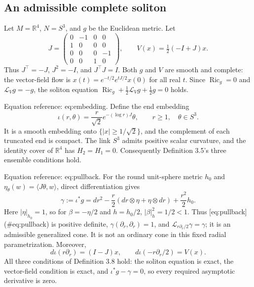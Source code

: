 \documentclass[10pt]{article}
\begin{document}
\subsection*{An admissible complete soliton}
Let \(M=\mathbb R^4\), \(N=S^3\), and \(g\) be the Euclidean metric. Let \[J=\begin{pmatrix}0&-1&0&0\\1&0&0&0\\0&0&0&-1\\0&0&1&0\end{pmatrix},
 \qquad V(x)=\tfrac12(-I+J)x .\] Thus \(J^\top=-J\), \(J^2=-I\), and \(J^\top J=I\). Both \(g\) and \(V\) are smooth and complete: the vector-field flow is \(x(t)=e^{-t/2}e^{tJ/2}x(0)\) for all real \(t\). Since \(\operatorname{Ric}_g=0\) and \(\mathcal L_Vg=-g\), the soliton equation \(\operatorname{Ric}_g+\tfrac12\mathcal L_Vg+\tfrac12g=0\) holds.\par
Equation reference: eq:embedding. Define the end embedding \[
 \iota(r,\theta)=\frac{r}{\sqrt2}e^{-(\log r)J}\theta,\qquad r\geq1,\quad\theta\in S^3.\] It is a smooth embedding onto \(\{|x|\geq1/\sqrt2\}\), and the complement of each truncated end is compact. The link \(S^3\) admits positive scalar curvature, and the identity cover of \(\mathbb R^4\) has \(H_2=H_1=0\). Consequently Definition 3.5’s three ensemble conditions hold.\par
Equation reference: eq:pullback. For the round unit-sphere metric \(h_0\) and \(\eta_\theta(w)=\langle J\theta,w\rangle\), direct differentiation gives \[
 \gamma:=\iota^*g
 =dr^2-\frac r2(dr\otimes\eta+\eta\otimes dr)+\frac{r^2}{2}h_0.\] Here \(|\eta|_{h_0}=1\), so for \(\beta=-\eta/2\) and \(h=h_0/2\), \(|\beta|_h^2=1/2<1\). Thus [eq:pullback] (\#eq:pullback) is positive definite, \(\gamma(\partial_r,\partial_r)=1\), and \(\mathcal L_{r\partial_r/2}\gamma=\gamma\); it is an admissible generalized cone. It is not an ordinary cone in this fixed radial parametrization. Moreover, \[d\iota(r\partial_r)=(I-J)x,\qquad
 d\iota(-r\partial_r/2)=V(x).\] All three conditions of Definition 3.8 hold: the soliton equation is exact, the vector-field condition is exact, and \(\iota^*g-\gamma=0\), so every required asymptotic derivative is zero.\par
\end{document}
